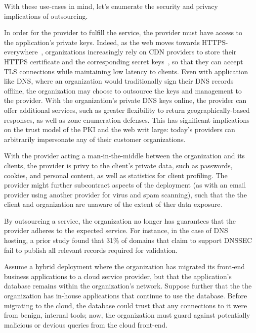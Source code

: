 With these use-cases in mind, let's enumerate the security and privacy
implications of outsourcing.


%
In order for the provider to fulfill the service, the provider must
have access to the application's private keys.
%
Indeed, as the web moves towards HTTPS-everywhere~\cite{felt-2017-https},
organizations increasingly rely on CDN providers to store their HTTPS
certificate and the corresponding secret keys~\cite{key-sharing,
when-https-meets-cdn}, so that they can accept TLS connections while
maintaining low latency to clients.
%
Even with application like DNS, where an organization would traditionally sign
their DNS records offline, the organization may choose to outsource the keys
and management to the provider.
%
With the organization's private DNS keys online, the provider can offer
additional services, such as greater flexibility to return geographically-based
responses, as well as zone enumeration defenses.
%
This has significant implications on the trust model of the PKI and the web
writ large: today's providers can arbitrarily impersonate any of their customer
organizations.


%
With the provider acting a man-in-the-middle between the
organization and its clients, the provider is privy to the client's private
data, such as passwords, cookies, and personal content, as well as statistics
for client profiling.
%
The provider might further subcontract aspects of the deployment (as with an
email provider using another provider for virus and spam scanning), such that
the the client and organization are unaware of the extent of ther data
exposure.


%
By outsourcing a service, the organization no longer has guarantees that the
provider adheres to the expected service.
%
For instance, in the case of DNS hosting, a prior study found that 31\% of
domains that claim to support DNSSEC fail to publish all relevant records
required for validation.


%
Assume a hybrid deployment where the organization has migrated its front-end
business applications to a cloud service provider, but that the application's
database remains within the organization’s network. 
%
Suppose further that the the organization has in-house applications that
continue to use the database. 
%
Before migrating to the cloud, the database could trust that any connections to
it were from benign, internal tools; now, the organization must guard against
potentially malicious or devious queries from the cloud front-end.


